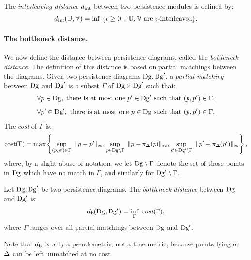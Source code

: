 \begin{defin} 
The \textit{interleaving distance $d_{\rm int}$} between two persistence modules is defined by: 
$$d_{\rm int}(\mathbb{U},\mathbb{V})=\inf\ \{\epsilon\geq 0\,:\, \mathbb{U},\mathbb{V}\text{ are $\epsilon$-interleaved}\}.$$
\end{defin}

\paragraph*{The bottleneck distance.} We now define the distance between persistence diagrams, called the {\em bottleneck distance}.
The definition of this distance is based on partial matchings between the
diagrams. Given two persistence diagrams $\mathrm{Dg},\mathrm{Dg}'$, a 
{\em partial matching} between $\mathrm{Dg}$ and $\mathrm{Dg}'$ is a subset $\Gamma$ of $\mathrm{Dg}\times \mathrm{Dg}'$ such that:
%
\[
\forall p\in \mathrm{Dg}, \text{ there is at most one }p'\in \mathrm{Dg}'\text{ such that }(p,p')\in\Gamma,
\]
\[
\forall p'\in \mathrm{Dg}', \text{ there is at most one }p\in \mathrm{Dg}\text{ such that }(p,p')\in\Gamma.
\]
%
The {\em cost} of $\Gamma$ is:
%
$$\text{cost}(\Gamma)=\max\left\{ \sup_{(p,p')\in\Gamma}\ \|p-p'\|_\infty,
\sup_{p\in\mathrm{Dg}\setminus\Gamma}\ \|p-\pi_\Delta(p)\|_\infty,\sup_{p'\in\mathrm{Dg}'\setminus\Gamma}\ \|p'-\pi_\Delta(p')\|_\infty\right\},
$$
where, by a slight abuse of notation, we let $\mathrm{Dg}\setminus\Gamma$ denote the set of those points in $\mathrm{Dg}$ which
have no match in $\Gamma$, and similarly for $\mathrm{Dg}'\setminus\Gamma$.
%
%
%
\begin{defin}
\label{def:bottleneck}
Let $\mathrm{Dg},\mathrm{Dg}'$ be two persistence diagrams.
The {\em bottleneck distance} between $\mathrm{Dg}$ and $\mathrm{Dg}'$ is:
%
\[
d_{\rm b}(\mathrm{Dg},\mathrm{Dg}')=\inf_{\Gamma}\ \emph{cost}(\Gamma),
\]
%
where $\Gamma$ ranges over all partial matchings between $\mathrm{Dg}$ and $\mathrm{Dg}'$.
\end{defin}
%
Note that $d_{\rm b}$ is only a pseudometric, not a true metric, because points lying on $\Delta$ can be left unmatched at no cost.

